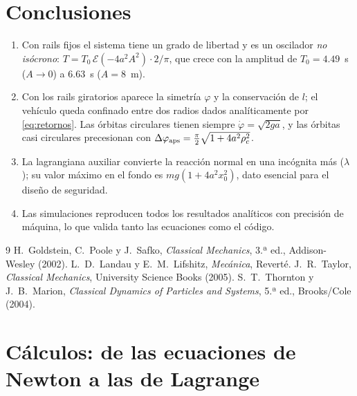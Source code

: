 \documentclass[11pt,a4paper]{article}
\begin{document}
\section{Conclusiones}
\begin{enumerate}[leftmargin=*]
 \item Con rails fijos el sistema tiene un grado de libertad y es un oscilador \emph{no isócrono}: $T=T_0\,\mathcal E(-4a^2A^2)\cdot2/\pi$, que crece con la amplitud de $T_0=4.49$~s ($A\to0$) a $6.63$~s ($A=8$~m).
 \item Con los rails giratorios aparece la simetría $\varphi$ y la conservación de $l$; el vehículo queda confinado entre dos radios dados analíticamente por \eqref{eq:retornos}. Las órbitas circulares tienen
 siempre $\dot\varphi=\sqrt{2ga}$, y las órbitas casi circulares precesionan con $\Delta\varphi_{\rm aps}=\frac\pi2\sqrt{1+4a^2\rho_c^2}$.
 \item La lagrangiana auxiliar convierte la reacción normal en una incógnita más ($\lambda$); su valor máximo en el fondo es $mg(1+4a^2x_0^2)$, dato esencial para el diseño de seguridad.
 \item Las simulaciones reproducen todos los resultados analíticos con precisión de máquina, lo que valida tanto las ecuaciones como el código.
\end{enumerate}

\begin{thebibliography}{9}
 H.~Goldstein, C.~Poole y J.~Safko, \emph{Classical Mechanics}, 3.ª ed., Addison-Wesley (2002).
 L.~D.~Landau y E.~M.~Lifshitz, \emph{Mecánica}, Reverté.
 J.~R.~Taylor, \emph{Classical Mechanics}, University Science Books (2005).
 S.~T.~Thornton y J.~B.~Marion, \emph{Classical Dynamics of Particles and Systems}, 5.ª ed., Brooks/Cole (2004).
\end{thebibliography}

\appendix
\section{Cálculos: de las ecuaciones de Newton a las de Lagrange}\label{app:lagrange}
\end{document}
